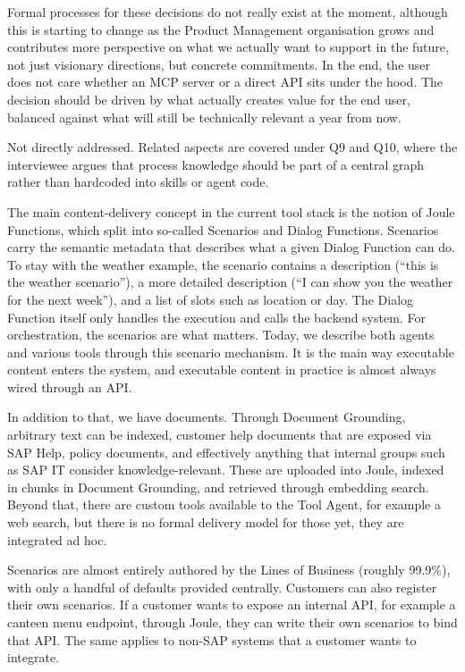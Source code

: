 Formal processes for these decisions do not really exist at the moment, although this is starting to change as the Product Management organisation grows and contributes more perspective on what we actually want to support in the future, not just visionary directions, but concrete commitments. In the end, the user does not care whether an MCP server or a direct API sits under the hood. The decision should be driven by what actually creates value for the end user, balanced against what will still be technically relevant a year from now.

\medskip{}

Not directly addressed. Related aspects are covered under Q9 and Q10, where the interviewee argues that process knowledge should be part of a central graph rather than hardcoded into skills or agent code.

\medskip{}

The main content-delivery concept in the current tool stack is the notion of Joule Functions, which split into so-called Scenarios and Dialog Functions. Scenarios carry the semantic metadata that describes what a given Dialog Function can do. To stay with the weather example, the scenario contains a description (``this is the weather scenario''), a more detailed description (``I can show you the weather for the next week''), and a list of slots such as location or day. The Dialog Function itself only handles the execution and calls the backend system. For orchestration, the scenarios are what matters. Today, we describe both agents and various tools through this scenario mechanism. It is the main way executable content enters the system, and executable content in practice is almost always wired through an API.

In addition to that, we have documents. Through Document Grounding, arbitrary text can be indexed, customer help documents that are exposed via SAP Help, policy documents, and effectively anything that internal groups such as SAP IT consider knowledge-relevant. These are uploaded into Joule, indexed in chunks in Document Grounding, and retrieved through embedding search. Beyond that, there are custom tools available to the Tool Agent, for example a web search, but there is no formal delivery model for those yet, they are integrated ad hoc.

Scenarios are almost entirely authored by the Lines of Business (roughly 99.9\%), with only a handful of defaults provided centrally. Customers can also register their own scenarios. If a customer wants to expose an internal API, for example a canteen menu endpoint, through Joule, they can write their own scenarios to bind that API. The same applies to non-SAP systems that a customer wants to integrate.

